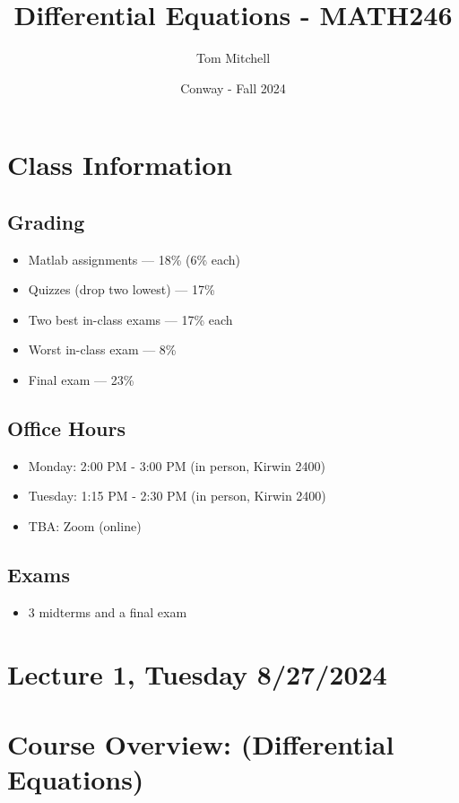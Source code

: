 \documentclass{article}
\title{Differential Equations - MATH246}
\author{Tom Mitchell}
\date{Conway - Fall 2024}
\begin{document}
\maketitle

\section*{Class Information}

\subsection*{Grading}
\begin{itemize}
    \item Matlab assignments — 18\% (6\% each)
    \item Quizzes (drop two lowest) — 17\%
    \item Two best in-class exams — 17\% each
    \item Worst in-class exam — 8\%
    \item Final exam — 23\%
\end{itemize}

\subsection*{Office Hours}
\begin{itemize}
    \item Monday: 2:00 PM - 3:00 PM (in person, Kirwin 2400)
    \item Tuesday: 1:15 PM - 2:30 PM (in person, Kirwin 2400)
    \item TBA: Zoom (online)
\end{itemize}

\subsection*{Exams}
\begin{itemize}
    \item 3 midterms and a final exam
\end{itemize}

\section*{Lecture 1, Tuesday 8/27/2024}

\section*{Course Overview: (Differential Equations)}
\end{document}
